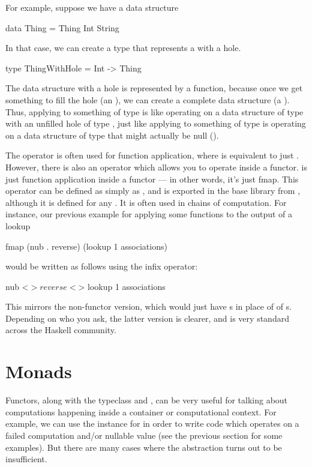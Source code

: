 For example, suppose we have a data structure
\begin{haskell}
data Thing = Thing Int String
\end{haskell}
In that case, we can create a type that represents a  with a hole.
\begin{haskell}
type ThingWithHole = Int -> Thing
\end{haskell}
The data structure with a hole is represented by a function, because once we get something to fill
the hole (an ), we can create a complete data structure (a ). Thus,
applying  to something of type  is like operating on a data structure
of type  with an unfilled hole of type , just like applying  to
something of type  is operating on a data structure of type  that might
actually be null ().

\begin{tangent}[frametitle=A Synonym for \inline{fmap}]
The operator \inline{\$} is often used for function application, where  is equivalent
to just . However, there is also an operator \inline{<\$>} which allows you to operate
inside a functor. \inline{<\$>} is just function application inside a functor --- in other words,
it's just fmap. This operator can be defined as simply as , and is exported in
the base library from , although it is defined for any
. It is often used in chains of computation. For instance, our previous example for
applying some functions to the output of a lookup
\begin{haskell}
fmap (nub . reverse) (lookup 1 associations)
\end{haskell}
would be written as follows using the infix \inline{<\$>} operator:
\begin{haskell}
nub <$> reverse <$> lookup 1 associations
\end{haskell}
This mirrors the non-functor version, which would just have \inline{\$}s in place of of
\inline{<\$>}s. Depending on who you ask, the latter version is clearer, and is very standard across
the Haskell community.
\end{tangent}

\section{Monads}
\label{sec:monads}
Functors, along with the  typeclass and , can be very useful for
talking about computations happening inside a container or computational context. For example, we
can use the  instance for  in order to write code which operates on a
failed computation and/or nullable value (see the previous section for some examples). But there are
many cases where the  abstraction turns out to be insufficient.

